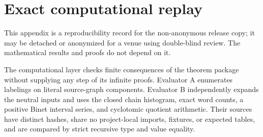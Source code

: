 \section{Exact computational replay}
\label{sec:replay}

This appendix is a reproducibility record for the non-anonymous release copy;
it may be detached or anonymized for a venue using double-blind review.  The
mathematical results and proofs do not depend on it.

The computational layer checks finite consequences of the theorem package
without supplying any step of its infinite proofs.  Evaluator A enumerates
labelings on literal source-graph components.  Evaluator B independently
expands the neutral inputs and uses the closed chain histogram, exact word
counts, a positive Binet interval series, and cyclotomic quotient
arithmetic.  Their sources have distinct hashes, share no project-local
imports, fixtures, or expected tables, and are compared by strict recursive
type and value equality.

